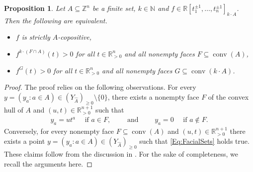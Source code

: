 \documentclass[a4paper,11pt]{amsart}
\newtheorem{proposition}[theorem]{Proposition}
\theoremstyle{definition}
\DeclareMathOperator{\conv}{conv}
\newcommand{\RR}{\mathbb{R}}
\begin{document}
\begin{proposition}
\label{Prop:InteriorOfCA_bis}
Let $A \subseteq \mathbb{Z}^n$ be a finite set, $k \in \mathbb{N}$ and $f \in \RR[t_1^{\pm 1}, \dots , t_n^{\pm 1}]_{k \cdot A}$. 
Then the following are equivalent.
\begin{itemize}
    \item[(ii)] $f$ is strictly  $A$-copositive,
    \item[(iii)]  $f^{k\cdot(F \cap A)}(t) > 0$ for all $t \in \mathbb{R}^n_{>0}$ and all nonempty faces $F \subseteq \conv(A)$,
    \item[(iv)]  $f^G(t) > 0$ for all $t \in \mathbb{R}^n_{>0}$ and all nonempty faces $G \subseteq \conv(k \cdot A)$.
\end{itemize}
\end{proposition}
\begin{proof}
The proof relies on the following observations.
For every $y = (y_a \colon a \in A) \in (Y_{\hat{A}})_{\geq0} \setminus \{0\}$, there exists a nonempty face $F$ of the convex hull of $A$  and $(u,t) \in \mathbb{R}^{n+1}_{>0}$ such that
\begin{align}
\label{Eq:FacialSets}
    y_a = u t^{a} \quad \text{ if } a \in F, \qquad \text{ and } \qquad  y_a = 0 \quad \text{ if } a \notin F.
\end{align}
Conversely, for every nonempty face $F \subseteq \conv(A)$ and $(u,t) \in \RR_{>0}^{n+1}$ there exists a point $y = (y_a \colon a \in A) \in (Y_{\hat{A}})_{\geq0}$ such that \eqref{Eq:FacialSets} holds true. These claims follow from the discussion in \cite[Section 5.1]{TelenBook}. For the sake of completeness, we recall the arguments here.


\end{proof}
\end{document}
